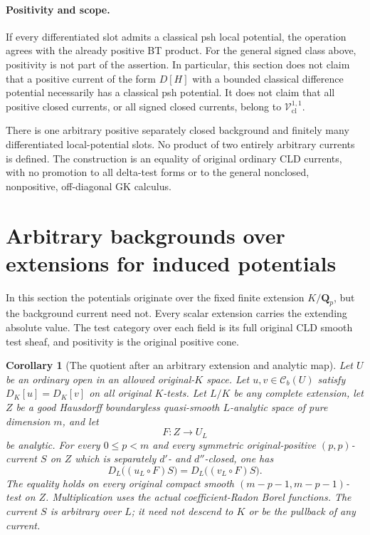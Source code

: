 \documentclass[11pt,a4paper]{article}
\numberwithin{equation}{section}
\newtheorem{corollary}[theorem]{Corollary}
\theoremstyle{definition}
\theoremstyle{remark}
\begin{document}
\paragraph{Positivity and scope.}
If every differentiated slot admits a classical psh local
potential, the operation agrees with the already positive
BT product.  For the general signed class above, positivity
is not part of the assertion.  In particular, this section
does not claim that a positive current of the form $D[H]$
with a bounded classical difference potential necessarily
has a classical psh potential.  It does not claim that all
positive closed currents, or all signed closed currents,
belong to $\mathscr V^{1,1}_{\mathrm{cl}}$.

There is one arbitrary positive separately closed background
and finitely many differentiated local-potential slots.
No product of two entirely arbitrary currents is defined.
The construction is an equality of original ordinary CLD
currents, with no promotion to all delta-test forms or to
the general nonclosed, nonpositive, off-diagonal GK calculus.



\section{Arbitrary backgrounds over extensions for induced potentials}
\label{sec:r5-induced-potential-background-quotient}

In this section the potentials originate over the fixed finite
extension $K/\mathbf Q_p$, but the background current need not.
Every scalar extension carries the extending absolute value.
The test category over each field is its full original CLD smooth
test sheaf, and positivity is the original positive cone.

\begin{corollary}[The quotient after an arbitrary extension and analytic map]
\label{cor:r5-induced-potential-background-quotient}
Let $U$ be an ordinary open in an allowed original-$K$ space.
Let $u,v\in\mathcal C_b(U)$ satisfy $D_K[u]=D_K[v]$ on all
original $K$-tests.  Let $L/K$ be any complete extension, let
$Z$ be a good Hausdorff boundaryless quasi-smooth $L$-analytic
space of pure dimension $m$, and let
\[
                            F:Z\longrightarrow U_L
\]
be analytic.  For every $0\leq p<m$ and every symmetric
original-positive $(p,p)$-current $S$ on $Z$ which is separately
$d'$- and $d''$-closed, one has
\begin{equation}
 D_L\bigl((u_L\circ F)S\bigr)
          =D_L\bigl((v_L\circ F)S\bigr).
 \label{eq:r5-induced-potential-background-quotient}
\end{equation}
The equality holds on every original compact smooth
$(m-p-1,m-p-1)$-test on $Z$.  Multiplication uses the actual
coefficient-Radon Borel functions.  The current $S$ is arbitrary
over $L$; it need not descend to $K$ or be the pullback of any
current.
\end{corollary}
\end{document}
